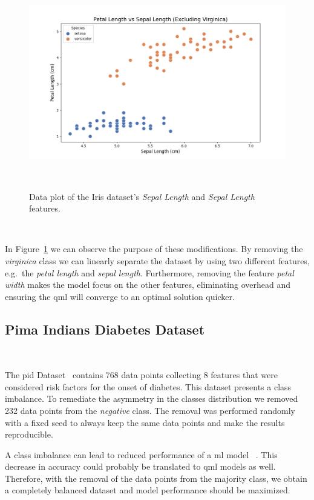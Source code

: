 \begin{figure}[h!]
  \includegraphics[scale=0.5]{figures/iris-linear-separation.png}
  \centering
  \caption{Data plot of the Iris dataset's \textit{Sepal Length} and \textit{Sepal Length} features.}
~\label{fig:iris_linear}
\end{figure} \

In Figure~\ref{fig:iris_linear} we can observe the purpose of these
modifications. By removing the \textit{virginica} class we can
linearly separate the dataset by using two different features,
e.g.\ the \textit{petal length} and \textit{sepal length}. Furthermore,
removing the feature \textit{petal width} makes the model focus on
the other features, eliminating overhead and ensuring the \ac{qml}
will converge to an optimal solution quicker. \

\subsection{Pima Indians Diabetes Dataset}\label{subsection:diabetes} \

The \ac{pid} Dataset~\cite{smith_using_1988} contains
768 data points collecting 8 features that were considered risk
factors for the onset of diabetes. This dataset presents a class
imbalance. To remediate the asymmetry in the classes distribution
we removed 232 data points from the \textit{negative} class. The
removal was performed randomly with a fixed seed to always
keep the same data points and make the results reproducible. \

A class imbalance can lead to reduced performance of a \ac{ml} model
~\cite{drummond_c45_nodate}. This decrease in accuracy could
probably be translated to \ac{qml} models as well. Therefore,
with the removal of the data points from the majority class, we
obtain a completely balanced dataset and model performance should
be maximized. \

